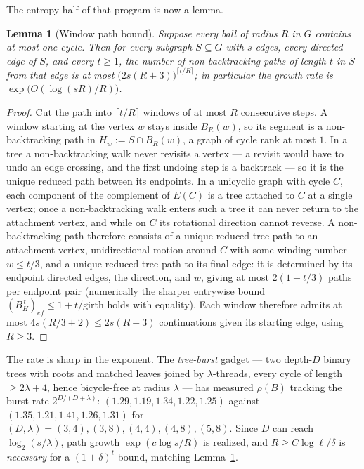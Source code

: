 \documentclass[11pt]{article}
\newtheorem{lemma}{Lemma}
\theoremstyle{remark}
\begin{document}
The entropy half of that program is now a lemma.

\begin{lemma}[Window path bound]\label{lem:window}
Suppose every ball of radius $R$ in $G$ contains at most one cycle.
Then for every subgraph $S\subseteq G$ with $s$ edges, every directed
edge of $S$, and every $t\ge1$, the number of non-backtracking paths
of length $t$ in $S$ from that edge is at most
$\big(2s(R+3)\big)^{\lceil t/R\rceil}$; in particular the growth rate
is $\exp\!\big(O(\log(sR)/R)\big)$.
\end{lemma}

\begin{proof}
Cut the path into $\lceil t/R\rceil$ windows of at most $R$
consecutive steps. A window starting at the vertex $w$ stays inside
$B_R(w)$, so its segment is a non-backtracking path in
$H_w:=S\cap B_R(w)$, a graph of cycle rank at most $1$. In a tree a
non-backtracking walk never revisits a vertex --- a revisit would have
to undo an edge crossing, and the first undoing step is a backtrack
--- so it is the unique reduced path between its endpoints. In a
unicyclic graph with cycle $C$, each component of the complement of
$E(C)$ is a tree attached to $C$ at a single vertex; once a
non-backtracking walk enters such a tree it can never return to the
attachment vertex, and while on $C$ its rotational direction cannot
reverse. A non-backtracking path therefore consists of a unique
reduced tree path to an attachment vertex, unidirectional motion
around $C$ with some winding number $w\le t/3$, and a unique reduced
tree path to its final edge: it is determined by its endpoint directed
edges, the direction, and $w$, giving at most $2(1+t/3)$ paths per
endpoint pair (numerically the sharper entrywise bound
$(B_H^{\,t})_{ef}\le1+t/\mathrm{girth}$ holds with equality). Each
window therefore admits at most $4s(R/3+2)\le2s(R+3)$
continuations given its starting edge, using $R\ge3$.
\end{proof}

The rate is sharp in the exponent. The \emph{tree-burst} gadget ---
two depth-$D$ binary trees with roots and matched leaves joined by
$\lambda$-threads, every cycle of length $\ge2\lambda+4$, hence
bicycle-free at radius $\lambda$ --- has measured $\rho(B)$ tracking
the burst rate $2^{D/(D+\lambda)}$: $(1.29,1.19,1.34,1.22,1.25)$
against $(1.35,1.21,1.41,1.26,1.31)$ for
$(D,\lambda)=(3,4),(3,8),(4,4),(4,8),(5,8)$. Since $D$ can reach
$\log_2(s/\lambda)$, path growth $\exp(c\log s/R)$ is realized, and
$R\ge C\log\ell/\delta$ is \emph{necessary} for a $(1+\delta)^t$
bound, matching Lemma~\ref{lem:window}.
\end{document}
